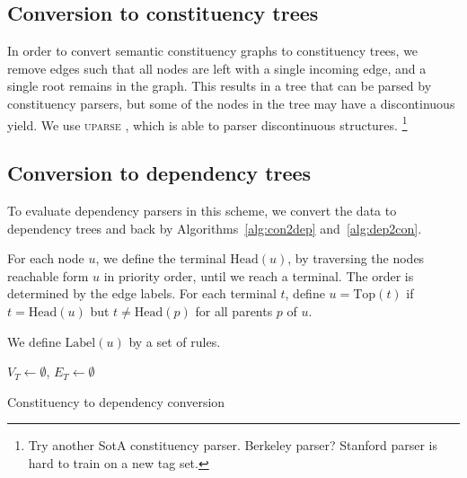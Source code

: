 \documentclass[11pt]{article}
\newcommand{\daniel}[1]{\footnote{\color{blue} #1}}
\begin{document}
\subsection{Conversion to constituency trees}

In order to convert semantic constituency graphs to constituency trees, we remove edges such that all nodes are left with a single incoming edge, and a single root remains in the graph. This results in a tree that can be parsed by constituency parsers, but some of the nodes in the tree may have a discontinuous yield. We use \textsc{uparse} \cite{maier2015discontinuous}, which is able to parser discontinuous structures.
\daniel{Try another SotA constituency parser. Berkeley parser? Stanford parser is hard to train on a new tag set.}


\subsection{Conversion to dependency trees}

To evaluate dependency parsers in this scheme, we convert the data to dependency trees and back by Algorithms~\ref{alg:con2dep} and~\ref{alg:dep2con}.

For each node $u$, we define the terminal $\mathrm{Head}(u)$, by traversing the nodes reachable form $u$ in priority order, until we reach a terminal. The order is determined by the edge labels. For each terminal $t$, define $u=\mathrm{Top}(t)$ if $t=\mathrm{Head}(u)$ but $t\neq \mathrm{Head}(p)$ for all parents $p$ of $u$.

We define $\mathrm{Label}(u)$ by a set of rules.

\begin{algorithm}[t]
 $V_T \leftarrow \emptyset$,
 $E_T \leftarrow \emptyset$\\
 \caption{Constituency to dependency conversion}
 \label{alg:con2dep}
\end{algorithm}
\end{document}
